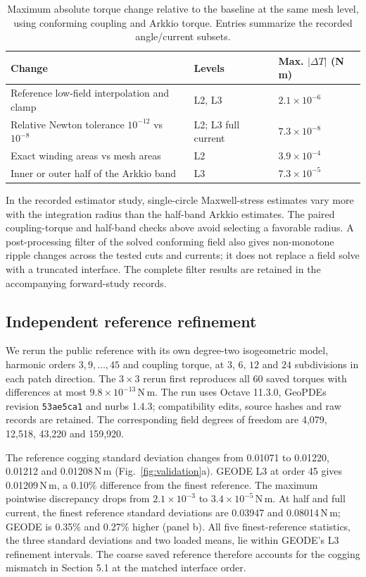 \documentclass{anvil-paper}
\begin{document}
\begin{table}[htbp]\centering\small
\caption{Maximum absolute torque change relative to the baseline at the
same mesh level, using conforming coupling and Arkkio torque. Entries
summarize the recorded angle/current subsets.}
\label{tab:sensitivity}
\begin{tabular}{p{.48\linewidth}ll}\toprule
Change & Levels & Max. $|\Delta T|$ (N\,m)\\\midrule
Reference low-field interpolation and clamp & L2, L3 & $2.1\times10^{-6}$\\
Relative Newton tolerance $10^{-12}$ vs $10^{-8}$ & L2; L3 full current & $7.3\times10^{-8}$\\
Exact winding areas vs mesh areas & L2 & $3.9\times10^{-4}$\\
Inner or outer half of the Arkkio band & L3 & $7.3\times10^{-5}$\\
\bottomrule\end{tabular}
\end{table}

In the recorded estimator study, single-circle Maxwell-stress estimates
vary more with the integration radius than the half-band Arkkio estimates.
The paired coupling-torque and half-band checks above avoid selecting a
favorable radius. A post-processing filter of the solved conforming field
also gives non-monotone ripple changes across the tested cuts and currents;
it does not replace a field solve with a truncated interface. The complete
filter results are retained in the accompanying forward-study records.

\subsection{Independent reference refinement}\label{sec:refinement}
We rerun the public reference with its own degree-two isogeometric model,
harmonic orders $3,9,\ldots,45$ and coupling torque, at $3$, $6$, $12$ and
$24$ subdivisions in each patch direction. The $3\times3$ rerun first
reproduces all 60 saved torques with differences at most $9.8\times10^{-13}$\,N\,m.
The run uses Octave 11.3.0, GeoPDEs revision \texttt{53ae5ca1} and nurbs
1.4.3; compatibility edits, source hashes and raw records are retained.
The corresponding field degrees of freedom are 4,079, 12,518, 43,220
and 159,920.

The reference cogging standard deviation changes from 0.01071 to 0.01220,
0.01212 and 0.01208\,N\,m (Fig.~\ref{fig:validation}a). GEODE L3 at order
45 gives 0.01209\,N\,m, a 0.10\% difference from the finest reference.
The maximum pointwise discrepancy drops from $2.1\times10^{-3}$ to
$3.4\times10^{-5}$\,N\,m. At half and full current, the finest reference
standard deviations are 0.03947 and 0.08014\,N\,m; GEODE is 0.35\% and
0.27\% higher (panel b). All five finest-reference statistics, the three
standard deviations and two loaded means, lie within GEODE's L3
refinement intervals. The coarse saved reference therefore accounts for
the cogging mismatch in Section 5.1 at the matched interface order.
\end{document}
